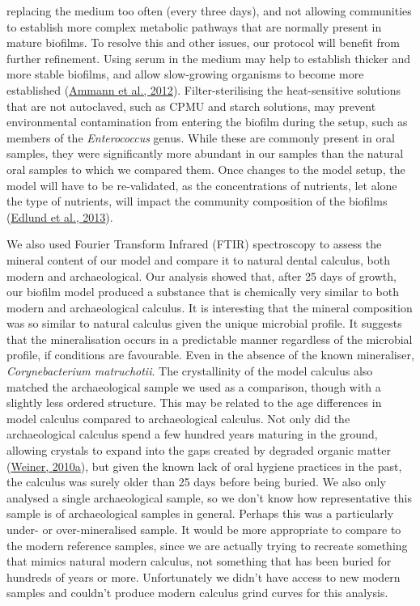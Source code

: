 \documentclass[
  letterpaper,
]{book}
\begin{document}
replacing the medium too often (every three days), and not allowing
communities to establish more complex metabolic pathways that are
normally present in mature biofilms. To resolve this and other issues,
our protocol will benefit from further refinement. Using serum in the
medium may help to establish thicker and more stable biofilms, and allow
slow-growing organisms to become more established
(\protect\hyperlink{ref-ammannZurichBiofilm2012}{Ammann et al., 2012}).
Filter-sterilising the heat-sensitive solutions that are not autoclaved,
such as CPMU and starch solutions, may prevent environmental
contamination from entering the biofilm during the setup, such as
members of the \emph{Enterococcus} genus. While these are commonly
present in oral samples, they were significantly more abundant in our
samples than the natural oral samples to which we compared them. Once
changes to the model setup, the model will have to be re-validated, as
the concentrations of nutrients, let alone the type of nutrients, will
impact the community composition of the biofilms
(\protect\hyperlink{ref-edlundBiofilmModel2013}{Edlund et al., 2013}).

We also used Fourier Transform Infrared (FTIR) spectroscopy to assess
the mineral content of our model and compare it to natural dental
calculus, both modern and archaeological. Our analysis showed that,
after 25 days of growth, our biofilm model produced a substance that is
chemically very similar to both modern and archaeological calculus. It
is interesting that the mineral composition was so similar to natural
calculus given the unique microbial profile. It suggests that the
mineralisation occurs in a predictable manner regardless of the
microbial profile, if conditions are favourable. Even in the absence of
the known mineraliser, \emph{Corynebacterium matruchotii}. The
crystallinity of the model calculus also matched the archaeological
sample we used as a comparison, though with a slightly less ordered
structure. This may be related to the age differences in model calculus
compared to archaeological calculus. Not only did the archaeological
calculus spend a few hundred years maturing in the ground, allowing
crystals to expand into the gaps created by degraded organic matter
(\protect\hyperlink{ref-weinerBiologicalMaterials2010}{Weiner, 2010a}),
but given the known lack of oral hygiene practices in the past, the
calculus was surely older than 25 days before being buried. We also only
analysed a single archaeological sample, so we don't know how
representative this sample is of archaeological samples in general.
Perhaps this was a particularly under- or over-mineralised sample. It
would be more appropriate to compare to the modern reference samples,
since we are actually trying to recreate something that mimics natural
modern calculus, not something that has been buried for hundreds of
years or more. Unfortunately we didn't have access to new modern samples
and couldn't produce modern calculus grind curves for this analysis.
\end{document}
